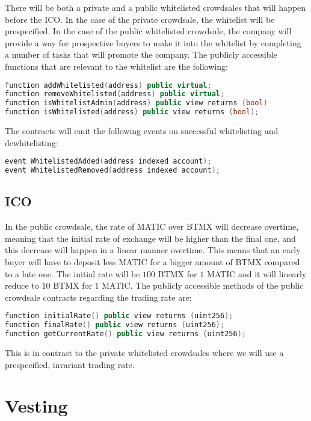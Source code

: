 \documentclass[a4paper,12pt]{article}
\begin{document}
There will be both a private and a public whitelisted crowdsales that will happen before the ICO.
In the case of the private crowdsale, the whitelist will be prespecified.
In the case of the public whitelisted crowdsale, the company will provide a way for prospective buyers to make it into the whitelist by completing a number of tasks that will promote the company.
The publicly accessible functions that are relevant to the whitelist are the following:

\begin{lstlisting}[language=C++, caption=Solidity whitelisted crowdsale function signatures.]
function addWhitelisted(address) public virtual;
function removeWhitelisted(address) public virtual;
function isWhitelistAdmin(address) public view returns (bool)
function isWhitelisted(address) public view returns (bool);
\end{lstlisting}

The contracts will emit the following events on successful whitelisting and dewhitelisting:
\begin{lstlisting}[language=C++, caption=Solidity crowdsale whitelist events.]
event WhitelistedAdded(address indexed account);
event WhitelistedRemoved(address indexed account);
\end{lstlisting}

\subsection{ICO}
In the public crowdsale, the rate of MATIC over BTMX will decrease overtime,
meaning that the initial rate of exchange will be higher than the final one, and this
decrease will happen in a linear manner overtime.
This means that an early buyer will have to
deposit less MATIC for a bigger amount of BTMX compared to a late one.
The initial rate will be
$100$ BTMX for $1$ MATIC and it will linearly reduce to $10$ BTMX for $1$ MATIC.
The publicly accessible methods of the public crowdsale contracts regarding the trading rate are:
\begin{lstlisting}[language=C++, caption=Solidity public crowdsale rate function signatures.]
function initialRate() public view returns (uint256);
function finalRate() public view returns (uint256);
function getCurrentRate() public view returns (uint256);
\end{lstlisting}
This is in contrast to the private whitelisted crowdsales where we will use a prespecified, invariant trading rate.

\section{Vesting}
\end{document}
